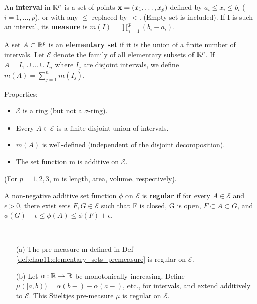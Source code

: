 \begin{definition}
  \label{def:chap11:elementary_sets_premeasure}
  An \textbf{interval} in $\mathbb{R}^p$ is a set of points $\mathbf{x}=(x_1,
  \dots, x_p)$ defined by $a_i \le x_i \le b_i$ ($i=1, \dots, p$), or
  with any $\le$ replaced by $<$. (Empty set is included).
  If I is such an interval, its \textbf{measure} is $m(I) =
  \prod_{i=1}^p (b_i - a_i)$.

  A set $A \subset \mathbb{R}^p$ is an \textbf{elementary set} if it is the
  union of a finite number of intervals. Let $\mathcal{E}$ denote the
  family of all elementary subsets of $\mathbb{R}^p$.
  If $A = I_1 \cup \dots \cup I_n$ where $I_j$ are disjoint
  intervals, we define $m(A) = \sum_{j=1}^n m(I_j)$.

  Properties:
  \begin{itemize}
    \item $\mathcal{E}$ is a ring (but not a $\sigma$-ring).
    \item Every $A \in \mathcal{E}$ is a finite disjoint union of intervals.
    \item $m(A)$ is well-defined (independent of the disjoint decomposition).
    \item The set function m is additive on $\mathcal{E}$.
  \end{itemize}
  (For $p=1, 2, 3$, m is length, area, volume, respectively).
\end{definition}

\begin{definition}
  \label{def:chap11:regular_set_function}
  A non-negative additive set function $\phi$ on $\mathcal{E}$ is
  \textbf{regular} if for every $A \in \mathcal{E}$ and $\epsilon >
  0$, there exist sets $F, G \in \mathcal{E}$ such that F is closed,
  G is open, $F \subset A \subset G$, and $\phi(G) - \epsilon \le
  \phi(A) \le \phi(F) + \epsilon$.
\end{definition}

\begin{example}
  \label{ex:chap11:regular_examples}
  ~ %
  \begin{itemize}
    \item[(a)] The pre-measure m defined in Def
      \ref{def:chap11:elementary_sets_premeasure} is regular on $\mathcal{E}$.
    \item[(b)] Let $\alpha: \mathbb{R} \to \mathbb{R}$ be monotonically increasing.
      Define $\mu([a, b)) = \alpha(b-) - \alpha(a-)$, etc., for
      intervals, and extend additively to $\mathcal{E}$. This
      Stieltjes pre-measure $\mu$ is regular on $\mathcal{E}$.
  \end{itemize}
\end{example}

